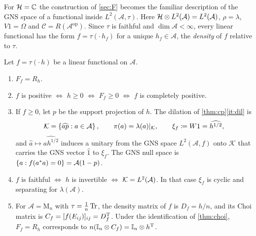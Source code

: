 \documentclass[12pt]{article}
\newcommand{\alg}{\mathcal{A}}             %
\newcommand{\hilb}{\mathcal{H}}            %
\newcommand{\dil}{\mathcal{K}}             %
\newcommand{\Mn}[1]{\mathrm{M}_{#1}}       %
\newcommand{\op}{^{\mathrm{op}}}           %
\newcommand{\Ltwo}{L^2\br{\alg}}
\newcommand{\vect}[1]{\widehat{#1}}
\newcommand{\Ltn}{\hilb \tensor \Ltwo}
\newcommand{\comm}{\mathcal{C}}            %
\begin{document}
For \(\hilb = \complex\) the construction of \cref{sec:F} becomes the familiar
description of the GNS space of a functional inside \(L^2(\alg,\tau)\). Here
\(\Ltn = \Ltwo\), \(\rho = \lambda\), \(V1 = \Omega\) and \(\comm = R(\alg\op)\).
Since \(\tau\) is faithful and \(\dim\alg < \infty\), every linear functional
has the form \(f = \tau(\cdot\,h_f)\) for a unique \(h_f \in \alg\), the
\emph{density} of \(f\) relative to \(\tau\).

\begin{proposition}[Functionals]
\label{prop:gns}
Let \(f = \tau(\cdot\,h)\) be a linear functional on \(\alg\).
\begin{enumerate}[label=(\alph*)]
  \item \label{it:gns-F}
    \(F_f = R_h\).
  \item \label{it:gns-pos}
    \(f\) is positive \(\iff\) \(h \ge 0\) \(\iff\) \(F_f \ge 0\) \(\iff\) \(f\) is
    completely positive.
  \item \label{it:gns-dil}
    If \(f \ge 0\), let \(p\) be the support projection of \(h\). The dilation of
    \cref{thm:cp}\ref{it:dil} is
    \[
      \dil = \set{\vect{ap} : a \in \alg}, \qquad
      \pi(a) = \lambda(a)|_{\dil}, \qquad
      \xi_f \eqdef W1 = \vect{h^{1/2}},
    \]
    and \(\vect a \mapsto \vect{ah^{1/2}}\) induces a unitary from the GNS space
    \(L^2(\alg, f)\) onto \(\dil\) that carries the GNS vector \(\vect 1\) to
    \(\xi_f\). The GNS null space is
    \(\set{a : f(a^\adjoint a) = 0} = \alg(1 - p)\).
  \item \label{it:gns-faithful}
    \(f\) is faithful \(\iff\) \(h\) is invertible \(\iff\) \(\dil = \Ltwo\). In
    that case \(\xi_f\) is cyclic and separating for \(\lambda(\alg)\).
  \item \label{it:gns-choi}
    For \(\alg = \Mn n\) with \(\tau = \frac1n\operatorname{Tr}\), the density matrix of
    \(f\) is \(D_f = h/n\), and its Choi matrix is
    \(C_f = [f(E_{ij})]_{ij} = D_f^{\mathrm T}\). Under the identification of
    \cref{thm:choi}, \(F_f = R_h\) corresponds to
    \(n({\mathbb I}_n \otimes C_f) = {\mathbb I}_n \otimes h^{\mathrm T}\).
\end{enumerate}
\end{proposition}
\end{document}
